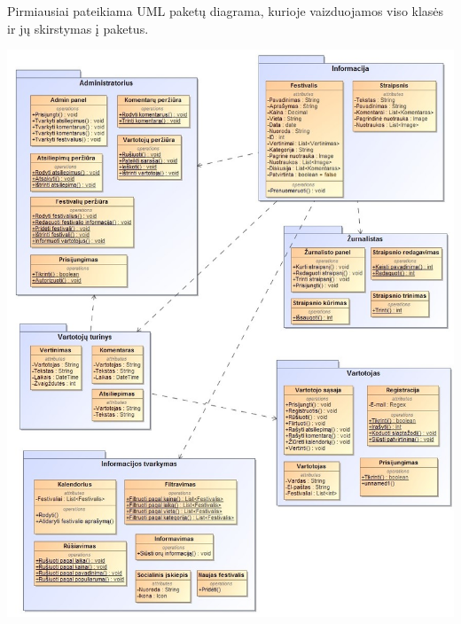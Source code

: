 ﻿\documentclass{VUMIFPSkursinis}
\begin{document}
Pirmiausiai pateikiama UML paketų diagrama, kurioje vaizduojamos viso klasės ir jų skirstymas į paketus.
\begin{center}
    \includegraphics[scale=0.5]{img/PSI3/paketai}
\end{center}
\end{document}
